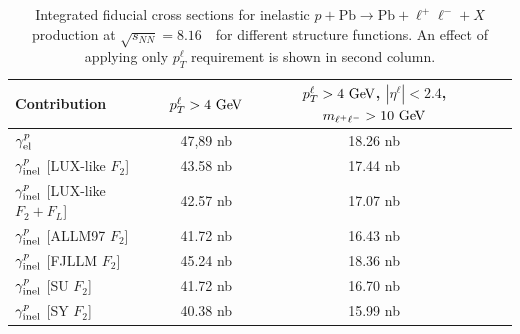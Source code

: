 \begin{table}[t]
\centering
\begin{tabular}{|l|c|c|c|}
\hline
Contribution  &  $p_{T}^{\ell}>4~\text{Ge\kern -0.1em V}$ & $p_{T}^{\ell}>4~\text{Ge\kern -0.1em V}$, $|\eta^{\ell}|<2.4 $, $m_{\ell^+\ell^-}>10~\text{Ge\kern -0.1em V}$ \\
\hline
$\gamma^{p}_{\rm{el}}$   & 47,89 nb  & 18.26 nb \\
\hline
$\gamma^{p}_{\rm{inel}}$ [LUX-like  $F_2$]  & 43.58 nb  &  17.44 nb\\
\hline
$\gamma^{p}_{\rm{inel}}$ [LUX-like  $F_2+F_L$]  & 42.57 nb    & 17.07 nb\\
\hline    
$\gamma^{p}_{\rm{inel}}$ [ALLM97 $F_2$]  & 41.72 nb   &16.43 nb\\
\hline
$\gamma^{p}_{\rm{inel}}$ [FJLLM $F_2$]  & 45.24 nb  &18.36 nb\\
\hline
$\gamma^{p}_{\rm{inel}}$ [SU $F_2$]  & 41.72  nb &16.70 nb\\
\hline 
$\gamma^{p}_{\rm{inel}}$ [SY $F_2$]  & 40.38  nb  &15.99 nb\\
\hline
\end{tabular}
\caption{Integrated fiducial cross sections for inelastic $p+\textrm{Pb}\rightarrow \textrm{Pb} + \ell^+\ell^- + X$ production at $\sqrt{s_{N N}} = 8.16$~\TeV\ for different structure functions. 
An effect of applying only $p_T^{\ell}$ requirement is shown in second column.
}
\label{tab:kt}
\end{table}



